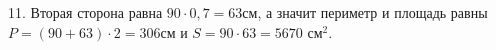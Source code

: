 11. Вторая сторона равна $90\cdot0,7=63$см, а значит периметр и площадь равны $P=(90+63)\cdot2=306$см и $S=90\cdot63=5670\text{ см}^2.$\\

